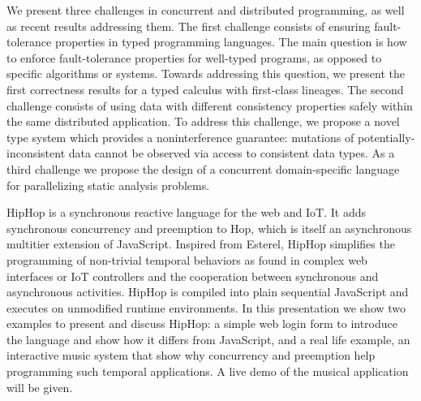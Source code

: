 \documentclass[a4paper,UKenglish]{dagrep-v2018}
\begin{document}

\license

We present three challenges in concurrent and distributed programming, as well as recent results addressing them. The first challenge consists of ensuring fault-tolerance properties in typed programming languages. The main question is how to enforce fault-tolerance properties for well-typed programs, as opposed to specific algorithms or systems. Towards addressing this question, we present the first correctness results for a typed calculus with first-class lineages. The second challenge consists of using data with different consistency properties safely within the same distributed application. To address this challenge, we propose a novel type system which provides a noninterference guarantee: mutations of potentially-inconsistent data cannot be observed via access to consistent data types. As a third challenge we propose the design of a concurrent domain-specific language for parallelizing static analysis problems.


\license

HipHop is a synchronous reactive language for the web and IoT.  It
adds synchronous concurrency and preemption to Hop, which is itself an
asynchronous multitier extension of JavaScript. Inspired from Esterel,
HipHop simplifies the programming of non-trivial temporal behaviors as
found in complex web interfaces or IoT controllers and the cooperation
between synchronous and asynchronous activities. HipHop is compiled
into plain sequential JavaScript and executes on unmodified runtime
environments.  In this presentation we show two examples to present
and discuss HipHop: a simple web login form to introduce the language
and show how it differs from JavaScript, and a real life example, an
interactive music system that show why concurrency and preemption help
programming such temporal applications. A live demo of the musical
application will be given.


\end{document}
